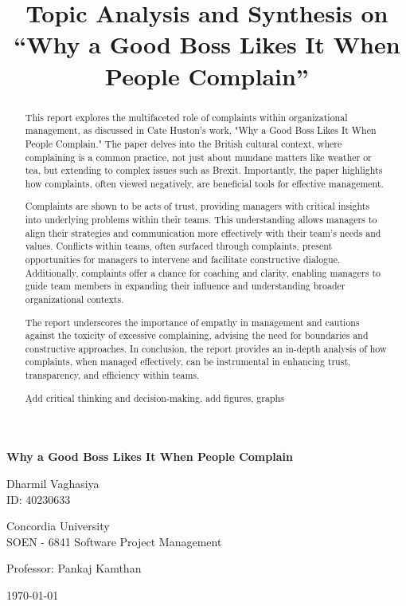 \documentclass[runningheads]{llncs}
\title{Topic Analysis and Synthesis on\\ ``Why a Good Boss Likes It When People
Complain''}
\begin{document}
%
\begin{titlepage}
    \centering
    \vspace*{1cm}
    
    \Large
    \textbf{Why a Good Boss Likes It When People Complain}
    
    \vspace{1.5cm}
    \normalsize
    Dharmil Vaghasiya\\
    ID: 40230633
    
    \vspace{1cm}
    Concordia University\\
    SOEN - 6841 Software Project Management
    
    \vspace{1.5cm}
    \normalsize
    Professor: Pankaj Kamthan
    
    \vfill
    \today %
\end{titlepage}

\setcounter{tocdepth}{2}
\tableofcontents

\newpage
\begin{abstract}
This report explores the multifaceted role of complaints within organizational management, as discussed in Cate Huston's work, "Why a Good Boss Likes It When People Complain." The paper delves into the British cultural context, where complaining is a common practice, not just about mundane matters like weather or tea, but extending to complex issues such as Brexit. Importantly, the paper highlights how complaints, often viewed negatively, are beneficial tools for effective management. 

Complaints are shown to be acts of trust, providing managers with critical insights into underlying problems within their teams. This understanding allows managers to align their strategies and communication more effectively with their team's needs and values. Conflicts within teams, often surfaced through complaints, present opportunities for managers to intervene and facilitate constructive dialogue. Additionally, complaints offer a chance for coaching and clarity, enabling managers to guide team members in expanding their influence and understanding broader organizational contexts.

The report underscores the importance of empathy in management and cautions against the toxicity of excessive complaining, advising the need for boundaries and constructive approaches. In conclusion, the report provides an in-depth analysis of how complaints, when managed effectively, can be instrumental in enhancing trust, transparency, and efficiency within teams.

\vspace{4cm}

\b{Add critical thinking and decision-making. add figures, graphs}


\end{abstract}
\newpage
\end{document}
